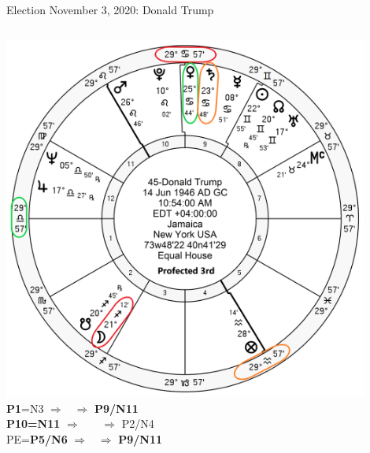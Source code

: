 \begin{frame}[t]{Election November 3, 2020: Donald Trump}
\begin{columns}[T, onlytextwidth]
\vspace{-1em}
{\includegraphics[width=0.9\textwidth]{charts/Trump-Prof-3rd.png}}
\fontsize{8pt}{9pt}\selectfont
\textbf{\dgreen P1}=N3
	$\Rightarrow$ \Venus\, $\Rightarrow$ \textbf{\red P9/N11}\\
\textbf{\red P10=N11}
	$\Rightarrow$ \Moon\, \Conjunction\, \SouthNode\, $\Rightarrow$ P2/N4\\
PE=\textbf{\dgreen P5/N6}
	 $\Rightarrow$ \Saturn\, $\Rightarrow$ \textbf{\red P9/N11}

\end{columns}
\end{frame}
